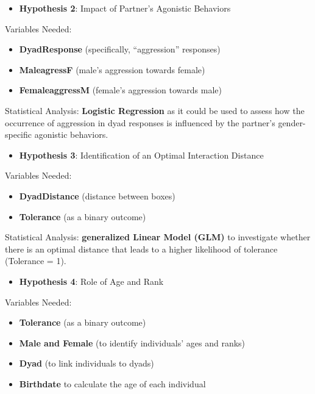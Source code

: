 \documentclass[
]{article}
\providecommand{\tightlist}{%
  \setlength{\itemsep}{0pt}\setlength{\parskip}{0pt}}
\begin{document}
\begin{itemize}
\tightlist
\item
  \textbf{Hypothesis 2}: Impact of Partner's Agonistic Behaviors
\end{itemize}

Variables Needed:

\begin{itemize}
\tightlist
\item
  \textbf{DyadResponse} (specifically, ``aggression'' responses)
\item
  \textbf{MaleagressF} (male's aggression towards female)
\item
  \textbf{FemaleaggressM} (female's aggression towards male)
\end{itemize}

Statistical Analysis: \textbf{Logistic Regression} as it could be used
to assess how the occurrence of aggression in dyad responses is
influenced by the partner's gender-specific agonistic behaviors.

\begin{itemize}
\tightlist
\item
  \textbf{Hypothesis 3}: Identification of an Optimal Interaction
  Distance
\end{itemize}

Variables Needed:

\begin{itemize}
\tightlist
\item
  \textbf{DyadDistance} (distance between boxes)
\item
  \textbf{Tolerance} (as a binary outcome)
\end{itemize}

Statistical Analysis: \textbf{generalized Linear Model (GLM)} to
investigate whether there is an optimal distance that leads to a higher
likelihood of tolerance (Tolerance = 1).

\begin{itemize}
\tightlist
\item
  \textbf{Hypothesis 4}: Role of Age and Rank
\end{itemize}

Variables Needed:

\begin{itemize}
\tightlist
\item
  \textbf{Tolerance} (as a binary outcome)
\item
  \textbf{Male and Female} (to identify individuals' ages and ranks)
\item
  \textbf{Dyad} (to link individuals to dyads)
\item
  \textbf{Birthdate} to calculate the age of each individual
\end{itemize}
\end{document}

